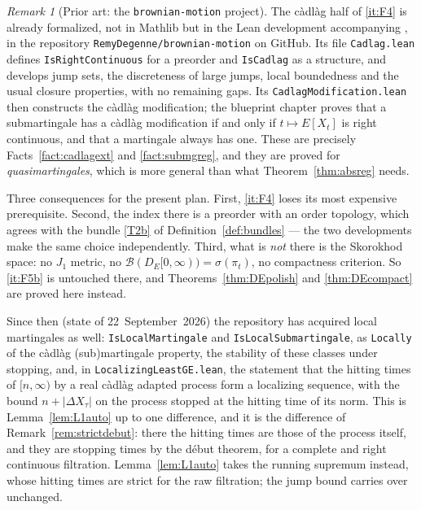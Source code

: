 \documentclass[11pt,a4paper]{article}
\theoremstyle{plain}
\theoremstyle{definition}
\theoremstyle{remark}
\newtheorem{remark}[theorem]{Remark}
\newcommand{\Bor}{\mathcal{B}}                 %
\newcommand{\DE}{D_E[0,\infty)}
\newcommand{\BM}{\cite{BM25}}
\begin{document}
\begin{remark}[Prior art: the \texttt{brownian-motion} project]
  \label{rem:bmrepo}
  The c\`adl\`ag half of \ref{it:F4} is already formalized, not in Mathlib but in
  the Lean development accompanying \BM, in the repository
  \texttt{RemyDegenne/}\allowbreak\texttt{brownian-motion} on GitHub.  Its file
  \texttt{Cadlag.lean} defines \texttt{IsRightContinuous} for a preorder and
  \texttt{IsCadlag} as a structure, and develops jump sets, the discreteness of
  large jumps, local boundedness and the usual closure properties, with no
  remaining gaps.  Its \texttt{CadlagModification.lean} then constructs the
  c\`adl\`ag modification; the blueprint chapter proves that a submartingale has a
  c\`adl\`ag modification if and only if $t \mapsto E[X_t]$ is right continuous,
  and that a martingale always has one.  These are precisely
  Facts~\ref{fact:cadlagext} and \ref{fact:submgreg}, and they are proved for
  \emph{quasimartingales}, which is more general than what
  Theorem~\ref{thm:absreg} needs.

  Three consequences for the present plan.  First, \ref{it:F4} loses its most
  expensive prerequisite.  Second, the index there is a preorder with an order
  topology, which agrees with the bundle \eqref{T2b} of Definition~\ref{def:bundles} ---
  the two developments make the same choice independently.  Third, what is
  \emph{not} there is the Skorokhod space: no $J_1$ metric, no
  $\Bor(\DE) = \sigma(\pi_t)$, no compactness criterion.  So \ref{it:F5b} is
  untouched there, and Theorems~\ref{thm:DEpolish} and \ref{thm:DEcompact} are
  proved here instead.

  Since then (state of 22~September~2026) the repository has acquired local
  martingales as well: \texttt{IsLocalMartingale} and
  \texttt{IsLocalSubmartingale}, as \texttt{Locally} of the c\`adl\`ag
  (sub)martingale property, the stability of these classes under stopping, and,
  in \texttt{Localizing}\allowbreak\texttt{LeastGE.lean}, the statement that the hitting times of
  $[n,\infty)$ by a real c\`adl\`ag adapted process form a localizing sequence,
  with the bound $n + \lvert \Delta X_\tau \rvert$ on the process stopped at
  the hitting time of its norm.  This is Lemma~\ref{lem:L1auto} up to one
  difference, and it is the difference of Remark~\ref{rem:strictdebut}: there
  the hitting times are those of the process itself, and they are stopping times
  by the d\'ebut theorem, for a complete and right continuous filtration.
  Lemma~\ref{lem:L1auto} takes the running supremum instead, whose hitting times
  are strict for the raw filtration; the jump bound carries over unchanged.
\end{remark}
\end{document}
